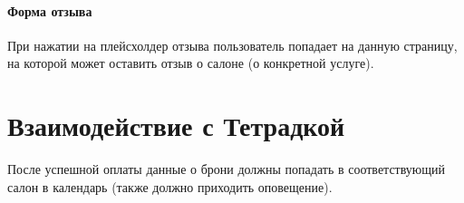 \documentclass[DIV=calc, paper=a4, fontsize=11pt]{scrartcl} %
\begin{document}
\paragraph{Форма отзыва}
При нажатии на плейсхолдер отзыва пользователь попадает на данную страницу, на которой может оставить отзыв о салоне (о конкретной услуге).



\section{Взаимодействие с Тетрадкой}
После успешной оплаты данные о брони должны попадать в соответствующий салон в календарь (также должно приходить оповещение).
\end{document}
